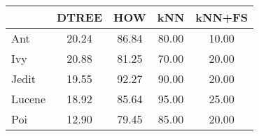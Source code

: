 \begin{figure}[t]
\centering
\begin{tabular}{l|c|c|c|c}
       & DTREE & HOW   & kNN   & kNN+FS \\\hline
Ant    & 20.24 & 86.84 & 80.00 & 10.00  \\
Ivy    & 20.88 & 81.25 & 70.00 & 20.00  \\
Jedit  & 19.55 & 92.27 & 90.00 & 20.00  \\
Lucene & 18.92 & 85.64 & 95.00 & 25.00  \\
Poi    & 12.90 & 79.45 & 85.00 & 20.00 

\caption{}
\label{fig:deltas_jur}
\end{tabular}
\end{figure}